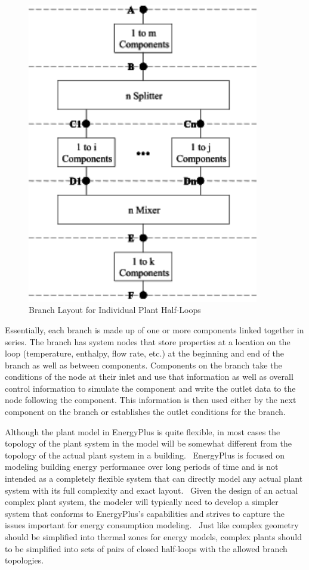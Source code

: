 \begin{figure}[hbtp] %
\centering
\includegraphics[width=0.9\textwidth, height=0.9\textheight, keepaspectratio=true]{media/image1958.svg.png}
\caption{Branch Layout for Individual Plant Half-Loops \protect \label{fig:branch-layout-for-individual-plant-half-loops}}
\end{figure}

Essentially, each branch is made up of one or more components linked together in series. The branch has system nodes that store properties at a location on the loop (temperature, enthalpy, flow rate, etc.) at the beginning and end of the branch as well as between components. Components on the branch take the conditions of the node at their inlet and use that information as well as overall control information to simulate the component and write the outlet data to the node following the component. This information is then used either by the next component on the branch or establishes the outlet conditions for the branch.

Although the plant model in EnergyPlus is quite flexible, in most cases the topology of the plant system in the model will be somewhat different from the topology of the actual plant system in a building.~ EnergyPlus is focused on modeling building energy performance over long periods of time and is not intended as a completely flexible system that can directly model any actual plant system with its full complexity and exact layout.~ Given the design of an actual complex plant system, the modeler will typically need to develop a simpler system that conforms to EnergyPlus's capabilities and strives to capture the issues important for energy consumption modeling.~ Just like complex geometry should be simplified into thermal zones for energy models, complex plants should to be simplified into sets of pairs of closed half-loops with the allowed branch topologies.

